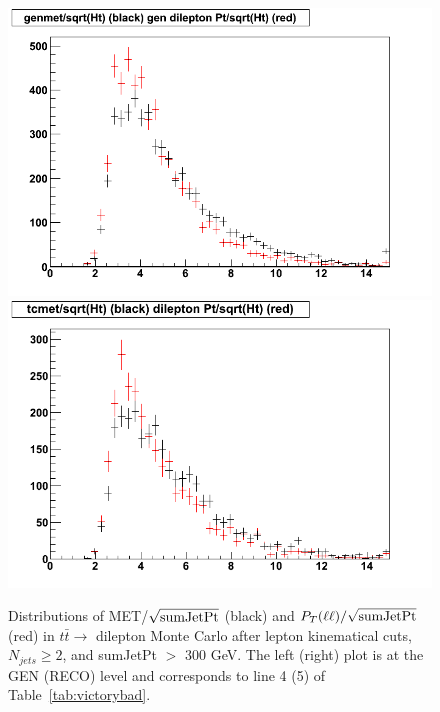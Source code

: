 \begin{figure}[bht]
\begin{center}
\includegraphics[width=0.48\linewidth]{genvictory_sqrtHt_Dec13.png}
\includegraphics[width=0.48\linewidth]{victory_Dec13.png}
\caption{\label{fig:victorybad}\protect Distributions 
of MET/$\sqrt{{\rm sumJetPt}}$ (black) and $P_T(\ell \ell)/\sqrt{{\rm sumJetPt}}$ 
(red) in $t\bar{t} \to$ dilepton Monte Carlo
after lepton kinematical cuts, $N_{jets} \ge 2$, and 
sumJetPt $>$ 300 GeV.  The left (right) plot is at the GEN (RECO) level 
and corresponds to line 4 (5) of Table~\ref{tab:victorybad}.}
\end{center}
\end{figure}



